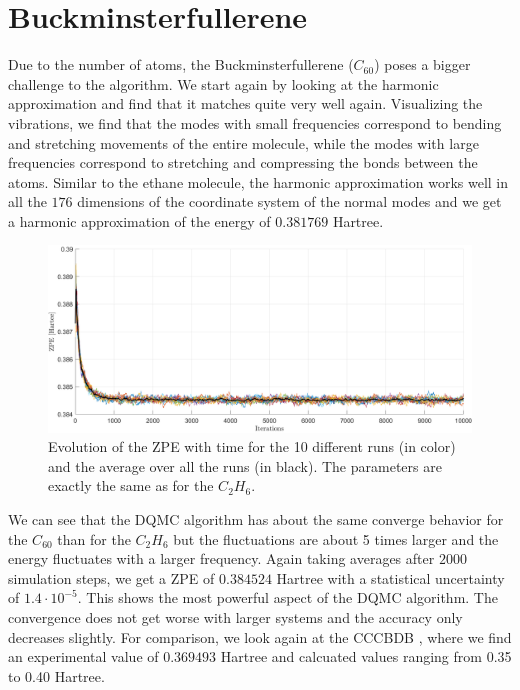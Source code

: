 \documentclass [12pt]{report}
\begin{document}
\section{Buckminsterfullerene}
Due to the number of atoms, the Buckminsterfullerene ($C_{60}$) poses a bigger challenge to the algorithm. We start again by looking at the harmonic approximation and find that it matches quite very well again. Visualizing the vibrations, we find that the modes with small frequencies correspond to bending and stretching movements of the entire molecule, while the modes with large frequencies correspond to stretching and compressing the bonds between the atoms. 
Similar to the ethane molecule, the harmonic approximation works well in all the $176$ dimensions of the coordinate system of the normal modes and we get a harmonic approximation of the energy of $0.381769$ Hartree.

\begin{figure}[h]
\includegraphics[width=\linewidth] {c60_1.png}
\caption{Evolution of the ZPE with time for the 10 different runs (in color) and the average over all the runs (in black). The parameters are exactly the same as for the $C_2H_6$.} \label{c60_1}
\end{figure}

We can see that the DQMC algorithm has about the same converge behavior for the $C_{60}$ than for the $C_2H_6$ but the fluctuations are about 5 times larger and the energy fluctuates with a larger frequency. Again taking averages after $2000$ simulation steps, we get a ZPE of $0.384524$ Hartree with a statistical uncertainty of $1.4 \cdot 10^{-5}$. This shows the most powerful aspect of the DQMC algorithm. The convergence does not get worse with larger systems and the accuracy only decreases slightly. For comparison, we look again at the CCCBDB \cite{cccbdb}, where we find an experimental value of  $0.369493$ Hartree and calcuated values ranging from 0.35 to 0.40 Hartree.\\
\end{document}

